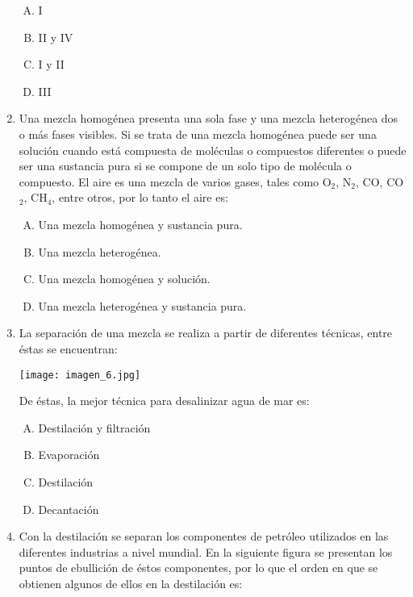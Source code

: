 \begin{enumerate}
\begin{enumerate}[(A)]
\item I
\item II y IV
\item I y II
\item III
\end{enumerate}


\item Una mezcla homogénea presenta una sola fase y una mezcla heterogénea dos o más fases visibles. Si se trata de una mezcla homogénea puede ser una solución cuando está compuesta de moléculas o compuestos diferentes o puede ser una sustancia pura si se compone de un solo tipo de molécula o compuesto.   El aire es una mezcla de varios gases, tales como O$_2$, N$_2$, CO, CO$_2$, CH$_4$, entre otros, por lo tanto el aire es: \label{mon-8}

\begin{enumerate}[(A)]
\item Una mezcla homogénea y sustancia pura.
\item Una mezcla heterogénea.
\item Una mezcla homogénea y solución.
\item Una mezcla heterogénea y sustancia pura. 
\end{enumerate}

\item La separación de una mezcla se realiza a partir de diferentes técnicas, entre éstas se encuentran: \label{mon-9}

\texttt{[image: imagen\_6.jpg]}

De éstas, la mejor técnica para desalinizar agua de mar es:
\begin{enumerate}[(A)]
\item Destilación y filtración
\item Evaporación
\item Destilación 
\item Decantación
\end{enumerate}


\item Con la destilación se separan los componentes de petróleo utilizados en las diferentes industrias a nivel mundial. En la siguiente figura se presentan los puntos de ebullición de éstos componentes, por lo que el orden en que se obtienen algunos de ellos en la destilación es:\label{mon-10}


\end{enumerate}

